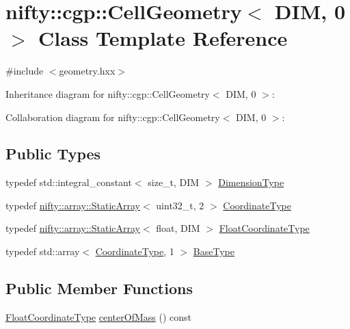 \hypertarget{classnifty_1_1cgp_1_1CellGeometry_3_01DIM_00_010_01_4}{}\section{nifty\+:\+:cgp\+:\+:Cell\+Geometry$<$ D\+I\+M, 0 $>$ Class Template Reference}
\label{classnifty_1_1cgp_1_1CellGeometry_3_01DIM_00_010_01_4}


{\ttfamily \#include $<$geometry.\+hxx$>$}



Inheritance diagram for nifty\+:\+:cgp\+:\+:Cell\+Geometry$<$ D\+I\+M, 0 $>$\+:


Collaboration diagram for nifty\+:\+:cgp\+:\+:Cell\+Geometry$<$ D\+I\+M, 0 $>$\+:
\subsection*{Public Types}
\begin{DoxyCompactItemize}
\item 
typedef std\+::integral\+\_\+constant$<$ size\+\_\+t, D\+I\+M $>$ \hyperlink{classnifty_1_1cgp_1_1CellGeometry_3_01DIM_00_010_01_4_a71116d45ef5d2db3ccf29b0258df02ed}{Dimension\+Type}
\item 
typedef \hyperlink{namespacenifty_1_1array_a683f151f19c851754e0c6d55ed16a0c2}{nifty\+::array\+::\+Static\+Array}$<$ uint32\+\_\+t, 2 $>$ \hyperlink{classnifty_1_1cgp_1_1CellGeometry_3_01DIM_00_010_01_4_a3c8cec60edc558f44940e98135a521f0}{Coordinate\+Type}
\item 
typedef \hyperlink{namespacenifty_1_1array_a683f151f19c851754e0c6d55ed16a0c2}{nifty\+::array\+::\+Static\+Array}$<$ float, D\+I\+M $>$ \hyperlink{classnifty_1_1cgp_1_1CellGeometry_3_01DIM_00_010_01_4_a825cfc0d2e082ccd4b34e5ab2046dbe6}{Float\+Coordinate\+Type}
\item 
typedef std\+::array$<$ \hyperlink{classnifty_1_1cgp_1_1CellGeometry_3_01DIM_00_010_01_4_a3c8cec60edc558f44940e98135a521f0}{Coordinate\+Type}, 1 $>$ \hyperlink{classnifty_1_1cgp_1_1CellGeometry_3_01DIM_00_010_01_4_a299d8c228b7529d2e95f90aa3b2f7528}{Base\+Type}
\end{DoxyCompactItemize}
\subsection*{Public Member Functions}
\begin{DoxyCompactItemize}
\item 
\hyperlink{classnifty_1_1cgp_1_1CellGeometry_3_01DIM_00_010_01_4_a825cfc0d2e082ccd4b34e5ab2046dbe6}{Float\+Coordinate\+Type} \hyperlink{classnifty_1_1cgp_1_1CellGeometry_3_01DIM_00_010_01_4_ac76ee365e72874db3e3a541c20f7f462}{center\+Of\+Mass} () const 
\end{DoxyCompactItemize}


